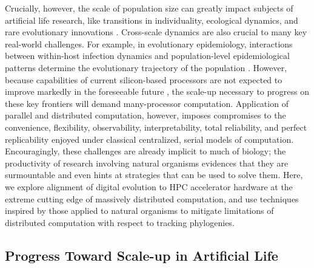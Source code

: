 Crucially, however, the scale of population size can greatly impact subjects of artificial life research, like transitions in individuality, ecological dynamics, and rare evolutionary innovations \citep{taylor2016open,dolson2021digital,taylor2019evolutionary}.
Cross-scale dynamics are also crucial to many key real-world challenges.
For example, in evolutionary epidemiology, interactions between within-host infection dynamics and population-level epidemiological patterns determine the evolutionary trajectory of the population \citep{schreiber2021cross}.
However, because capabilities of current silicon-based processors are not expected to improve markedly in the foreseeable future \citep{sutter2005free}, the scale-up necessary to progress on these key frontiers will demand many-processor computation.
Application of parallel and distributed computation, however, imposes compromises to the convenience, flexibility, observability, interpretability, total reliability, and perfect replicability enjoyed under classical centralized, serial models of computation.
Encouragingly, these challenges are already implicit to much of biology; the productivity of research involving natural organisms evidences that they are surmountable and even hints at strategies that can be used to solve them.
Here, we explore alignment of digital evolution to HPC accelerator hardware at the extreme cutting edge of massively distributed computation, and use techniques inspired by those applied to natural organisms to mitigate limitations of distributed computation with respect to tracking phylogenies.

\subsection{Progress Toward Scale-up in Artificial Life}

